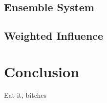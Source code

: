 \documentclass[10pt]{article}
\begin{document}



\subsection{Ensemble System}




\subsection{Weighted Influence}


\section{Conclusion}
Eat it, bitches


\nocite{Moreno03}



\end{document}
